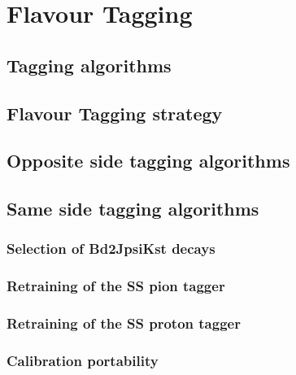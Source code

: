 \chapter{Flavour Tagging}
\label{ch:flavourtagging}

\blindtext

\section{Tagging algorithms}

\Blindtext

\section{Flavour Tagging strategy}

\Blindtext

\section{Opposite side tagging algorithms}

\Blindtext

\section{Same side tagging algorithms}

\blindtext

\subsection{Selection of Bd2JpsiKst decays}

\Blindtext

\subsection{Retraining of the SS pion tagger}

\Blindtext

\subsection{Retraining of the SS proton tagger}

\Blindtext

\subsection{Calibration portability}
